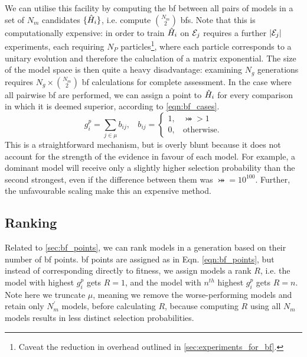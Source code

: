 We can utilise this facility by computing the \gls{bf} between all 
    pairs of models in a set of $N_m$ candidates $\{\hat{H}_i\}$, 
    i.e. compute ${N_m \choose 2}$ \gls{bf}s. 
Note that this is computationally expensive: 
    in order to train $\hat{H}_i$ on ${ \mathcal{E} }_j$ requires a further $\lvert { \mathcal{E} }_j \rvert$ experiments, 
    each requiring $N_P$ particles\footnote{Caveat the reduction in overhead outlined in \cref{sec:experiments_for_bf}.}, 
    where each particle corresponds to a unitary evolution and therefore the caluclation of a matrix exponential. 
The size of the \gls{model space} is then quite a heavy disadvantage: 
    examining $N_g$ generations requires $N_g \times {N_m \choose 2}$ \gls{bf} calculations for complete assessment. 
In the case where all pairwise \gls{bf} are performed, 
    we can assign a point to $\hat{H}_i$ for every comparison in which it is deemed superior, according to \cref{eqn:bf_cases}.
\begin{equation}
    \label{eqn:bf_points}
    g_i^p = \sum_{j \in \mu} b_{ij}, \ \ \ \ b_{ij} = 
        \begin{cases}
            1, \ \ \ \ \bij > 1 \\
            0, \ \ \ \ \text{otherwise}.
        \end{cases}
\end{equation}
This is a straightforward mechanism, but is overly blunt
    because it does not account for the strength of the evidence
    in favour of each model. 
For example, a dominant model will receive only a slightly higher selection probability 
    than the second strongest, even if the difference between them was $\bij = 10^{100}$. 
Further, the unfavourable scaling make this an expensive method. 

\subsection{Ranking}\label{sec:bf_ranking}
Related to \cref{sec:bf_points}, we can rank models in a generation based on their number of \gls{bf} points.
\gls{bf} points are assigned as in Eqn. \ref{eqn:bf_points}, 
    but instead of corresponding directly to fitness, 
    we assign models a rank $R$, 
    i.e. the model with highest $g_i^p$ gets $R=1$, 
    and the model with $n^{th}$ highest $g_i^p$ gets $R=n$. 
Note here we truncate $\mu$, meaning we remove the worse-performing models and retain only $N_m^{\prime}$ models, 
    before calculating $R$, because computing $R$ using all $N_m$ models results in less distinct selection probabilities. 

